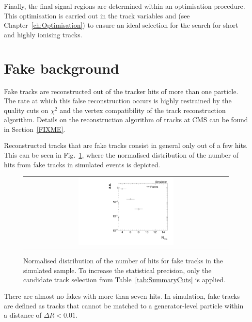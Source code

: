 Finally, the final signal regions are determined within an optimisation procedure.
This optimisation is carried out in the track variables \pt and \dedx (see Chapter~\ref{ch:Optimisation}) to ensure an ideal selection for the search for short and  highly ionising tracks.

\section{Fake background}
\label{sec:FakeBkg}
Fake tracks are reconstructed out of the tracker hits of more than one particle.
The rate at which this false reconstruction occurs is highly restrained by the quality cuts on $\chi^2$ and the vertex compatibility of the track reconstruction algorithm.
Details on the reconstruction algorithm of tracks at CMS can be found in Section~\ref{FIXME}.

Reconstructed tracks that are fake tracks consist in general only out of a few hits.
This can be seen in Fig.~\ref{fig:NValidFakes}, where the normalised distribution of the number of hits from fake tracks in simulated \WJets events is depicted.
\begin{figure}[!b]
  \centering 
  \begin{tabular}{c}
    \includegraphics[width=0.48\textwidth]{figures/analysis_2/Background/NValidForFakes_chiTracksfullSelectionNoQCDCutsNoTrigger.pdf}
  \end{tabular}
  \caption{Normalised distribution of the number of hits for fake tracks in the simulated \WJets sample. To increase the statistical precision, only the candidate track selection from Table~\ref{tab:SummaryCuts} is applied.}
  \label{fig:NValidFakes}
\end{figure}
There are almost no fakes with more than seven hits.
In simulation, fake tracks are defined as tracks that cannot be matched to a generator-level particle within a distance of $\Delta R < 0.01$.

